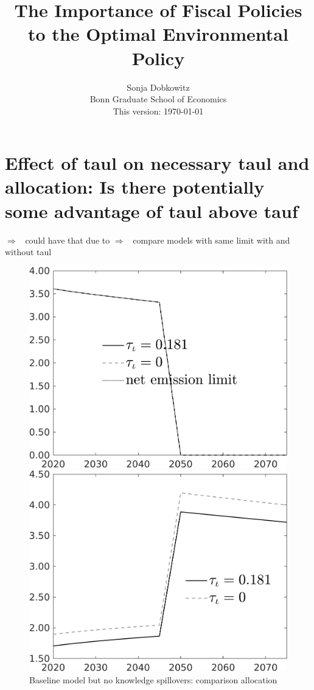 \documentclass[12pt]{article}
\title{The Importance of Fiscal Policies to the Optimal Environmental Policy}
\date{Sonja Dobkowitz\\ Bonn Graduate School of Economics\\ %
	\vspace{1mm}
	This version: \today }
\newcommand{\ar}{$\Rightarrow$ \ }
\begin{document}
\section{Effect of taul on necessary taul and allocation: Is there potentially some advantage of taul above tauf}
\ar could have that due to 
\ar compare models with same limit with and without taul

\begin{figure}[h!!]
	\centering
	\caption{Baseline model but no knowledge spillovers: comparison allocation}\label{fig:Leveltauf_nsk1_xgr0_noknow_notaul}
	\begin{minipage}[]{0.32\textwidth}
		\includegraphics[width=1\textwidth]{../../codding_model/own_basedOnFried/optimalPol_010922_revision/figures/all_13Sept22/CompTauf_bytaul_Reg0_Emnet_spillover0_nsk0_xgr0_knspil1_sep1_LFlimit1_emsbase0_countec0_GovRev0_etaa0.79_lgd1.png}
\end{minipage}		
\begin{minipage}[]{0.32\textwidth}
\includegraphics[width=1\textwidth]{../../codding_model/own_basedOnFried/optimalPol_010922_revision/figures/all_13Sept22/CompTauf_bytaul_Reg0_tauf_spillover0_nsk0_xgr0_knspil1_sep1_LFlimit1_emsbase0_countec0_GovRev0_etaa0.79_lgd1.png}

\end{minipage}
\end{figure}
\end{document}
